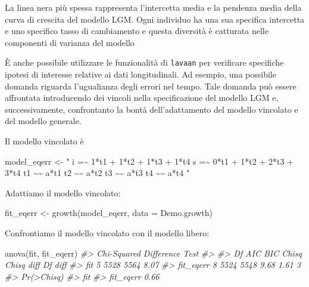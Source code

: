 \documentclass[
  11pt,
]{krantz}
\makeatletter
\newenvironment{Shaded}{\begin{snugshade}}{\end{snugshade}}
\newcommand{\AttributeTok}[1]{\textcolor[rgb]{0.61,0.61,0.61}{#1}}
\newcommand{\CommentTok}[1]{\textcolor[rgb]{0.37,0.37,0.37}{\textit{#1}}}
\newcommand{\FunctionTok}[1]{\textcolor[rgb]{0,0,0}{#1}}
\newcommand{\NormalTok}[1]{#1}
\newcommand{\OtherTok}[1]{\textcolor[rgb]{0.37,0.37,0.37}{#1}}
\newcommand{\StringTok}[1]{\textcolor[rgb]{0.5,0.5,0.5}{#1}}
\newenvironment{kframe}{%
\medskip{}
\setlength{\fboxsep}{.8em}
 \def\at@end@of@kframe{}%
 \ifinner\ifhmode%
  \def\at@end@of@kframe{\end{minipage}}%
  \begin{minipage}{\columnwidth}%
 \fi\fi%
 \def\FrameCommand##1{\hskip\@totalleftmargin \hskip-\fboxsep
 \colorbox{shadecolor}{##1}\hskip-\fboxsep
     \hskip-\linewidth \hskip-\@totalleftmargin \hskip\columnwidth}%
 \MakeFramed {\advance\hsize-\width
   \@totalleftmargin\z@ \linewidth\hsize
   \@setminipage}}%
 {\par\unskip\endMakeFramed%
 \at@end@of@kframe}
\renewenvironment{Shaded}{\begin{kframe}}{\end{kframe}}
\theoremstyle{definition}
\theoremstyle{definition}
\theoremstyle{definition}
\theoremstyle{definition}
\theoremstyle{remark}
\makeatother
\begin{document}
La linea nera più spessa rappresenta l'intercetta media e la pendenza media della curva di crescita del modello LGM. Ogni individuo ha una sua specifica intercetta e uno specifico tasso di cambiamento e questa diversità è catturata nelle componenti di varianza del modello

È anche possibile utilizzare le funzionalità di \texttt{lavaan} per verificare specifiche ipotesi di interesse relative ai dati longitudinali. Ad esempio, una possibile domanda riguarda l'ugualianza degli errori nel tempo. Tale domanda può essere affrontata introducendo dei vincoli nella specificazione del modello LGM e, successivamente, confrontanto la bontà dell'adattamento del modello vincolato e del modello generale.

Il modello vincolato è

\begin{Shaded}
\begin{Highlighting}[]
\NormalTok{model\_eqerr }\OtherTok{\textless{}{-}} \StringTok{"}
\StringTok{ i =\textasciitilde{} 1*t1 + 1*t2 + 1*t3 + 1*t4}
\StringTok{ s =\textasciitilde{} 0*t1 + 1*t2 + 2*t3 + 3*t4}
\StringTok{ t1 \textasciitilde{}\textasciitilde{} a*t1}
\StringTok{ t2 \textasciitilde{}\textasciitilde{} a*t2}
\StringTok{ t3 \textasciitilde{}\textasciitilde{} a*t3}
\StringTok{ t4 \textasciitilde{}\textasciitilde{} a*t4}
\StringTok{"}
\end{Highlighting}
\end{Shaded}

Adattiamo il modello vincolato:

\begin{Shaded}
\begin{Highlighting}[]
\NormalTok{fit\_eqerr }\OtherTok{\textless{}{-}} \FunctionTok{growth}\NormalTok{(model\_eqerr, }\AttributeTok{data =}\NormalTok{ Demo.growth)}
\end{Highlighting}
\end{Shaded}

Confrontiamo il modello vincolato con il modello libero:

\begin{Shaded}
\begin{Highlighting}[]
\FunctionTok{anova}\NormalTok{(fit, fit\_eqerr)}
\CommentTok{\#\textgreater{} Chi{-}Squared Difference Test}
\CommentTok{\#\textgreater{} }
\CommentTok{\#\textgreater{}           Df  AIC  BIC Chisq Chisq diff Df diff}
\CommentTok{\#\textgreater{} fit        5 5528 5564  8.07                   }
\CommentTok{\#\textgreater{} fit\_eqerr  8 5524 5548  9.68       1.61       3}
\CommentTok{\#\textgreater{}           Pr(\textgreater{}Chisq)}
\CommentTok{\#\textgreater{} fit                 }
\CommentTok{\#\textgreater{} fit\_eqerr       0.66}
\end{Highlighting}
\end{Shaded}
\end{document}
